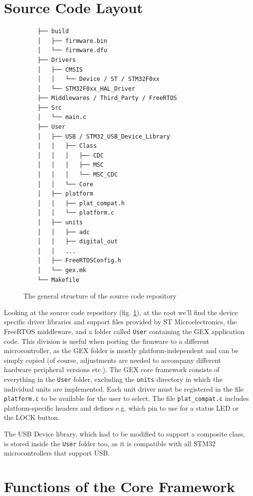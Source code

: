\section{Source Code Layout}

\begin{figure}
	\scriptsize\vspace{-3em}
	\begin{verbatim}
	├── build
	│   ├── firmware.bin
	│   └── firmware.dfu
	├── Drivers
	│   ├── CMSIS
	│   │   └── Device / ST / STM32F0xx
	│   └── STM32F0xx_HAL_Driver
	├── Middlewares / Third_Party / FreeRTOS
	├── Src
	│   └── main.c
	├── User
	│   ├── USB / STM32_USB_Device_Library
	│   │   ├── Class
	│   │   │   ├── CDC
	│   │   │   ├── MSC
	│   │   │   └── MSC_CDC
	│   │   └── Core
	│   ├── platform
	│   │   ├── plat_compat.h
	│   │   └── platform.c
	│   ├── units
	│   │   ├── adc
	│   │   ├── digital_out
	│   │   ...
	│   ├── FreeRTOSConfig.h
	│   └── gex.mk
	└── Makefile
	\end{verbatim}
	\vspace{-1em}
	\caption{\label{fig:repo-structure} The general structure of the source code repository}
\end{figure}

Looking at the source code repository (fig. \ref{fig:repo-structure}), at the root we'll find the device specific driver libraries and support files provided by ST Microelectronics, the FreeRTOS middleware, and a folder called \verb|User| containing the GEX application code. This division is useful when porting the firmware to a different microcontroller, as the GEX folder is mostly platform-independent and can be simply copied (of course, adjustments are needed to accompany different hardware peripheral versions etc.). The GEX core framework consists of everything in the \verb|User| folder, excluding the \verb|units| directory in which the individual units are implemented. Each unit driver must be registered in the file \verb|platform.c| to be available for the user to select. The file \verb|plat_compat.c| includes platform-specific headers and defines e.g. which pin to use for a status \gls{LED} or the LOCK button.

The \gls{USB} Device library, which had to be modified to support a composite class, is stored inside the \verb|User| folder too, as it is compatible with all STM32 microcontrollers that support \gls{USB}.


\section{Functions of the Core Framework}

